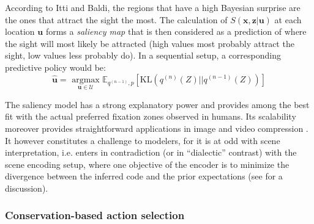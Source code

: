 \documentclass[12pt,twoside,openright]{article}
\begin{document}
According to Itti and Baldi, the regions that have a high Bayesian surprise are the ones that attract the sight the most. The calculation of $S(\boldsymbol{x}, \boldsymbol{z}| \boldsymbol{u})$ at each location $\boldsymbol{u}$ forms a \emph{saliency map} that is then considered as a prediction of where the sight will most likely be attracted (high values most probably attract the sight, low values less probably do). 
In a sequential setup, a corresponding predictive policy would be:
$$ \hat{\boldsymbol{u}} = \underset{\boldsymbol{u} \in \mathcal{U}}{\text{ argmax }} \mathbb{E}_{q^{(n-1)}, p}\left[\text{KL}(q^{(n)}(Z)||q^{(n-1)}(Z))\right]$$


The saliency model has a strong explanatory power and provides among the best fit with the actual preferred fixation zones observed in humans.
Its scalability moreover provides straightforward applications in image and video compression  \cite{wang2003foveation,guo2010novel}.
It  however constitutes a challenge to modelers, for it is at odd with scene interpretation,  
i.e. enters in contradiction (or in ``dialectic'' contrast) with the scene encoding setup, where one objective of the encoder is to minimize the divergence between the inferred code and the prior expectations (see \cite{friston2015active} for a discussion).

\subsubsection{Conservation-based action selection}
\end{document}
